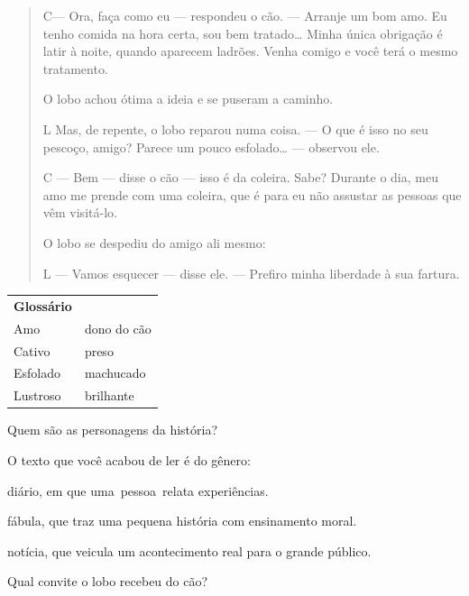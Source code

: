 \begin{escolha}
\begin{escolha}
{\begin{escolha}
\begin{quote}
C--- Ora, faça como eu --- respondeu o cão. --- Arranje um bom amo. Eu
tenho comida na hora certa, sou bem tratado\ldots{} Minha única
obrigação é latir à noite, quando aparecem ladrões. Venha comigo e você
terá o mesmo tratamento.

O lobo achou ótima a ideia e se puseram a caminho.

L Mas, de repente, o lobo reparou numa coisa. --- O que é isso no seu
pescoço, amigo? Parece um pouco esfolado\ldots{} --- observou ele.

C --- Bem --- disse o cão --- isso é da coleira. Sabe? Durante o dia,
meu amo me prende com uma coleira, que é para eu não assustar as pessoas
que vêm visitá-lo.

O lobo se despediu do amigo ali mesmo:

L --- Vamos esquecer --- disse ele. --- Prefiro minha liberdade à sua
fartura.
\end{quote}


\begin{tabular}{ll}
\textbf{Glossário} & \mbox{}\\
Amo & dono do cão\\
Cativo & preso\\
Esfolado & machucado\\
Lustroso & brilhante\\
\end{tabular}

\begin{escolha}
\item Quem são as personagens da história?


\item O texto que você acabou de ler é do gênero:

\begin{boxlist}
\boxitem[] diário, em que uma~pessoa~relata experiências.

\boxitem[\rosa{X}] fábula, que traz uma pequena história com ensinamento moral.

\boxitem[] notícia, que veicula um acontecimento real para o grande público.
\end{boxlist}

\item Qual convite o lobo recebeu do cão?



\end{escolha}
\end{escolha}}
\end{escolha}
\end{escolha}
